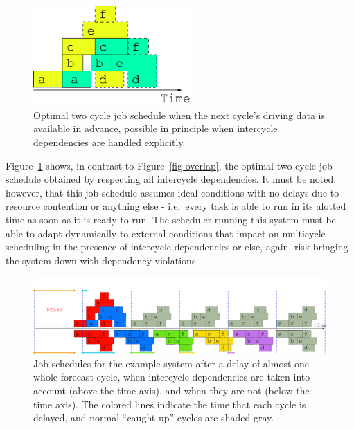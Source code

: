 \documentclass[11pt,a4paper]{article}
\begin{document}
\begin{figure} \label{fig-optimal-two}
    \begin{center}
        \includegraphics[width=6cm]{inkscape-svg/timeline-two-cycles-optimal} 
    \end{center}
    \caption[Optimal two-cycle job schedule]{\small Optimal two cycle
    job schedule when the next cycle's driving data is available in
    advance, possible in principle when intercycle dependencies are
    handled explicitly.} 
\end{figure} 

Figure~\ref{fig-optimal-two} shows, in contrast to
Figure~\ref{fig-overlap}, the optimal two cycle job schedule obtained by
respecting all intercycle dependencies. It must be noted, however, that
this job schedule assumes ideal conditions with no delays due to
resource contention or anything else - i.e.\ every task is able to run
in its alotted time as soon as it is ready to run. The scheduler running
this system must be able to adapt dynamically to external conditions 
that impact on multicycle scheduling in the presence of
intercycle dependencies or else, again, risk bringing the system down
with dependency violations.

\begin{figure} \label{fig-time-three}
    \begin{center}
        \includegraphics[width=12cm]{inkscape-svg/timeline-three} 
    \end{center}
    \caption[Post delay comparison of job schedules]{\small Job
    schedules for the example system after a delay of almost one whole
    forecast cycle, when intercycle dependencies are
    taken into account (above the time axis), and when they are not
    (below the time axis). The colored lines indicate the time that
    each cycle is delayed, and normal ``caught up'' cycles
    are shaded gray.} 
\end{figure} 
\end{document}
